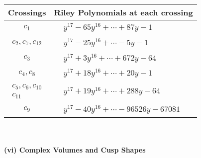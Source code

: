 \documentclass[1p]{elsarticle_modified}
\theoremstyle{definition}
\begin{document}
\begin{tabular}{m{50pt}|m{274pt}}
Crossings & \hspace{64pt}Riley Polynomials at each crossing \\
\hline $$\begin{aligned}c_{1}\end{aligned}$$&$\begin{aligned}
&y^{17}-65 y^{16}+\cdots+87 y-1
\end{aligned}$\\
\hline $$\begin{aligned}c_{2},c_{7},c_{12}\end{aligned}$$&$\begin{aligned}
&y^{17}-25 y^{16}+\cdots-5 y-1
\end{aligned}$\\
\hline $$\begin{aligned}c_{3}\end{aligned}$$&$\begin{aligned}
&y^{17}+3 y^{16}+\cdots+672 y-64
\end{aligned}$\\
\hline $$\begin{aligned}c_{4},c_{8}\end{aligned}$$&$\begin{aligned}
&y^{17}+18 y^{16}+\cdots+20 y-1
\end{aligned}$\\
\hline $$\begin{aligned}c_{5},c_{6},c_{10}\\c_{11}\end{aligned}$$&$\begin{aligned}
&y^{17}+19 y^{16}+\cdots+288 y-64
\end{aligned}$\\
\hline $$\begin{aligned}c_{9}\end{aligned}$$&$\begin{aligned}
&y^{17}-40 y^{16}+\cdots-96526 y-67081
\end{aligned}$\\
\hline
\end{tabular}\\~\\
\newpage\flushleft \textbf{(vi) Complex Volumes and Cusp Shapes}
\end{document}
